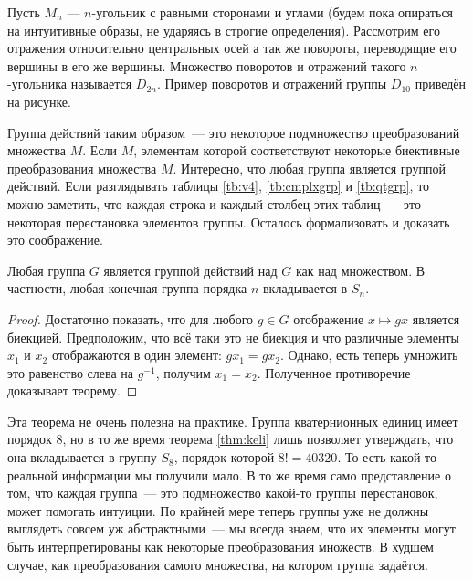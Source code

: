 \begin{definition}
	Пусть $M_n$ --- $n$-угольник с равными сторонами и углами (будем пока опираться на интуитивные образы, не ударяясь в строгие определения). Рассмотрим его отражения относительно центральных осей а так же повороты, переводящие его вершины в его же вершины. Множество поворотов и отражений такого $n$-угольника называется  $D_{2n}$. Пример поворотов и отражений группы $D_{10}$ приведён на рисунке.
\end{definition}


Группа действий таким образом~--- это некоторое подмножество преобразований множества $M$. Если $M$, элементам которой соответствуют некоторые биективные преобразования множества $M$. Интересно, что любая группа является группой действий. Если разглядывать таблицы \ref{tb:v4}, \ref{tb:cmplxgrp} и \ref{tb:qtgrp}, то можно заметить, что каждая строка и каждый столбец этих таблиц~--- это некоторая перестановка элементов группы. Осталось формализовать и доказать это соображение.

\begin{thm}\label{thm:keli}
	Любая группа $G$ является группой действий над $G$ как над множеством. В частности, любая конечная группа порядка $n$ вкладывается в $S_n$.
\end{thm}
\begin{proof}
	Достаточно показать, что для любого $g\in G$ отображение $x\mapsto gx$ является биекцией. Предположим, что всё таки это не биекция и что различные элементы $x_1$ и $x_2$ отображаются в один элемент: $gx_1 = gx_2$. Однако, есть теперь умножить это равенство слева на $g^{-1}$, получим $x_1 = x_2$. Полученное противоречие доказывает теорему.
\end{proof}

Эта теорема не очень полезна на практике. Группа кватернионных единиц имеет порядок 8, но в то же время теорема \ref{thm:keli} лишь позволяет утверждать, что она вкладывается в группу $S_8$, порядок которой $8!=40320$. То есть какой-то реальной информации мы получили мало. В то же время само представление о том, что каждая группа~--- это подмножество какой-то группы перестановок, может помогать интуиции. По крайней мере теперь группы уже не должны выглядеть совсем уж абстрактными~--- мы всегда знаем, что их элементы могут быть интерпретированы как некоторые преобразования множеств. В худшем случае, как преобразования самого множества, на котором группа задаётся.

